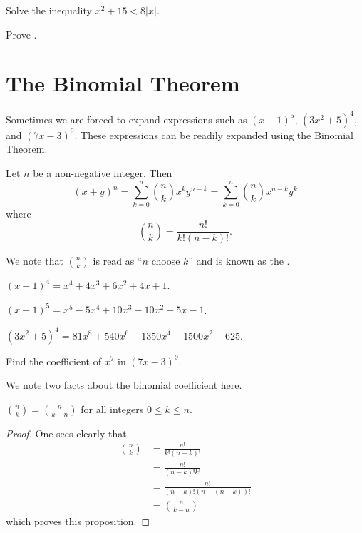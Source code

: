 \begin{exercise}
    Solve the inequality $x^2 + 15 < 8|x|$.
\end{exercise}

\begin{exercise}\label{exercise-triangle-inequality}
    Prove .
\end{exercise}

\section{The Binomial Theorem}
Sometimes we are forced to expand expressions such as $(x-1)^5$, $(3x^2 + 5)^4$, and $(7x - 3)^9$. These expressions can be readily expanded using the Binomial Theorem.
\begin{theorem}\label{thrm-binomial}
    Let $n$ be a non-negative integer. Then
    \[
        (x+y)^n = \sum_{k=0}^n {n \choose k}x^ky^{n-k} = \sum_{k=0}^n {n \choose k}x^{n-k}y^k
    \]
    where
    \[
        {n \choose k} = \frac{n!}{k!(n-k)!}.
    \]
\end{theorem}
We note that ${n \choose k}$ is read as ``$n$ choose $k$'' and is known as the .

\begin{example}
    $(x+1)^4 = x^4 + 4x^3 + 6x^2 + 4x + 1$.
\end{example}
\begin{example}
    $(x-1)^5 = x^5 - 5x^4 + 10x^3 - 10x^2 + 5x - 1$.
\end{example}
\begin{example}
    $(3x^2 + 5)^4 = 81x^8 + 540x^6 + 1350x^4 + 1500x^2 + 625$.
\end{example}

\begin{exercise}
    Find the coefficient of $x^7$ in $(7x-3)^9$.
\end{exercise}

We note two facts about the binomial coefficient here.
\begin{proposition}
    ${n\choose k} = {n\choose {k-n}}$ for all integers $0 \leq k \leq n$.
\end{proposition}
\begin{proof}
    One sees clearly that
    \begin{align*}
        {n\choose k} &= \frac{n!}{k!(n-k)!}\\
        &= \frac{n!}{(n-k)!k!}\\
        &= \frac{n!}{(n-k)!(n-(n-k))!}\\
        &= {n\choose {k-n}}
    \end{align*}
    which proves this proposition.
\end{proof}

